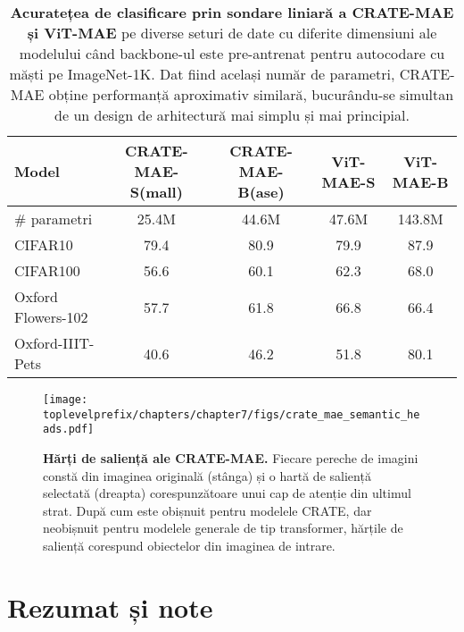 \documentclass[../../book-main_ro.tex]{subfiles}
\begin{document}
\begin{table}
    \centering 
    \begin{tabular}{@{}lcc|cc@{}}
        \toprule 
        \textbf{Model} & CRATE-MAE-S(mall) & CRATE-MAE-B(ase) & {\color{gray} ViT-MAE-S} & {\color{gray} ViT-MAE-B} \\
        \midrule
        \midrule
        \# parametri & 25.4M & 44.6M & 47.6M & {\color{gray}143.8M} \\
        \midrule
        CIFAR10 & 79.4 & 80.9 & {\color{gray} 79.9} & {\color{gray} 87.9} \\
        CIFAR100 & 56.6 & 60.1 & {\color{gray} 62.3} & {\color{gray} 68.0} \\
        Oxford Flowers-102 & 57.7 & 61.8 & {\color{gray} 66.8} & {\color{gray} 66.4} \\
        Oxford-IIIT-Pets & 40.6 & 46.2 & {\color{gray} 51.8} & {\color{gray} 80.1} \\
        \bottomrule
    \end{tabular}
    \caption{\small\textbf{Acuratețea de clasificare prin sondare liniară a CRATE-MAE și ViT-MAE} pe diverse seturi de date cu diferite dimensiuni ale modelului când backbone-ul este pre-antrenat pentru autocodare cu măști pe ImageNet-1K. Dat fiind același număr de parametri, CRATE-MAE obține performanță aproximativ similară, bucurându-se simultan de un design de arhitectură mai simplu și mai principial.}
    \label{tab:crate_mae_linear_probing}
\end{table}

\begin{figure}
    \centering 
    \texttt{[image: \\toplevelprefix/chapters/chapter7/figs/crate\_mae\_semantic\_heads.pdf]}
    \caption{\small\textbf{Hărți de saliență ale CRATE-MAE.} Fiecare pereche de imagini constă din imaginea originală (stânga) și o hartă de saliență selectată (dreapta) corespunzătoare unui cap de atenție din ultimul strat. După cum este obișnuit pentru modelele CRATE, dar neobișnuit pentru modelele generale de tip transformer, hărțile de saliență corespund obiectelor din imaginea de intrare.}
    \label{fig:crate_mae_semantic_heads}
\end{figure}





\section{Rezumat și note}
\end{document}
